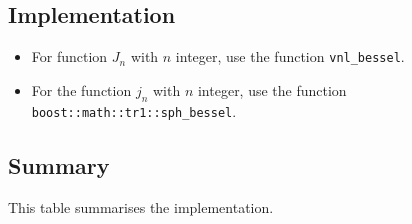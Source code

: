 \documentclass[11pt]{amsart}
\begin{document}
\subsection{Implementation}
\begin{itemize}
\item For function $J_n$ with $n$ integer, use the function \texttt{vnl\_bessel}.
\item For the function $j_n$ with $n$ integer, use the function \texttt{boost::math::tr1::sph\_bessel}.
\end{itemize}

\subsection{Summary}
This table summarises the implementation.\\
\end{document}
